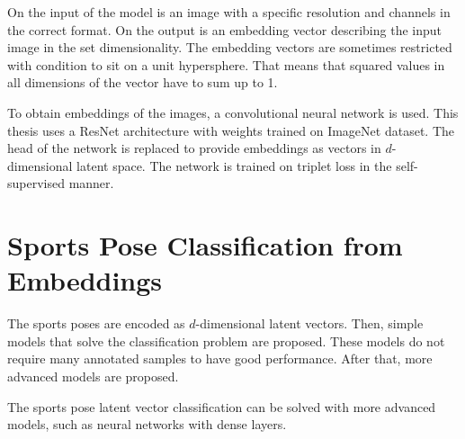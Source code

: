 On the input of the model is an image with a specific resolution and channels in the correct format. On the output is an embedding vector describing the input image in the set dimensionality. The embedding vectors are sometimes restricted with condition to sit on a unit hypersphere. That means that squared values in all dimensions of the vector have to sum up to 1.

To obtain embeddings of the images, a convolutional neural network is used. This thesis uses a ResNet architecture with weights trained on ImageNet dataset. The head of the network is replaced to provide embeddings as vectors in $d$-dimensional latent space. The network is trained on triplet loss in the self-supervised manner.

\section{\label{sec:classifier}Sports Pose Classification from Embeddings}

The sports poses are encoded as $d$-dimensional latent vectors. Then, simple models that solve the classification problem are proposed. These models do not require many annotated samples to have good performance. After that, more advanced models are proposed.

The sports pose latent vector classification can be solved with more advanced models, such as neural networks with dense layers.
